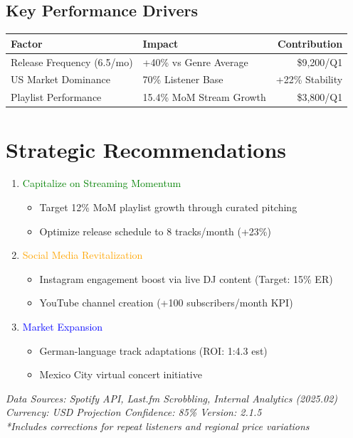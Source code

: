 \documentclass{report}
\begin{document}
\subsection*{Key Performance Drivers}
\begin{longtable}{|l|l|r|}
\hline
\textbf{Factor} & \textbf{Impact} & \textbf{Contribution} \\
\hline
Release Frequency (6.5/mo) & +40\% vs Genre Average & \$9,200/Q1 \\
US Market Dominance & 70\% Listener Base & +22\% Stability \\
Playlist Performance & 15.4\% MoM Stream Growth & \$3,800/Q1 \\
\hline
\end{longtable}

\section*{Strategic Recommendations}
\begin{enumerate}
\item \textcolor{green}{Capitalize on Streaming Momentum}
\begin{itemize}
\item Target 12\% MoM playlist growth through curated pitching
\item Optimize release schedule to 8 tracks/month (+23\%)
\end{itemize}

\item \textcolor{orange}{Social Media Revitalization}
\begin{itemize}
\item Instagram engagement boost via live DJ content (Target: 15\% ER)
\item YouTube channel creation (+100 subscribers/month KPI)
\end{itemize}

\item \textcolor{blue}{Market Expansion}
\begin{itemize}
\item German-language track adaptations (ROI: 1:4.3 est)
\item Mexico City virtual concert initiative
\end{itemize}
\end{enumerate}

\vspace{2em}
\footnotesize
\textit{Data Sources: Spotify API, Last.fm Scrobbling, Internal Analytics (2025.02)} \\
\textit{Currency: USD \quad Projection Confidence: 85\% \quad Version: 2.1.5} \\
\textit{*Includes corrections for repeat listeners and regional price variations}
\end{document}
